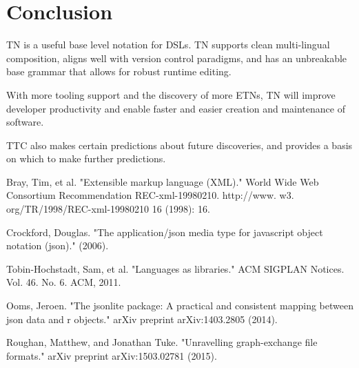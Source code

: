 \documentclass[journal]{IEEEtran}
\begin{document}
\section{Conclusion}

TN is a useful base level notation for DSLs. TN supports clean multi-lingual composition, aligns well with version control paradigms, and has an unbreakable base grammar that allows for robust runtime editing.

With more tooling support and the discovery of more ETNs, TN will improve developer productivity and enable faster and easier creation and maintenance of software.

TTC also makes certain predictions about future discoveries, and provides a basis on which to make further predictions.

\begin{thebibliography}{4}

Bray, Tim, et al. "Extensible markup language (XML)." World Wide Web Consortium Recommendation REC-xml-19980210. http://www. w3. org/TR/1998/REC-xml-19980210 16 (1998): 16.

Crockford, Douglas. "The application/json media type for javascript object notation (json)." (2006).

Tobin-Hochstadt, Sam, et al. "Languages as libraries." ACM SIGPLAN Notices. Vol. 46. No. 6. ACM, 2011.

Ooms, Jeroen. "The jsonlite package: A practical and consistent mapping between json data and r objects." arXiv preprint arXiv:1403.2805 (2014).

Roughan, Matthew, and Jonathan Tuke. "Unravelling graph-exchange file formats." arXiv preprint arXiv:1503.02781 (2015).

\end{thebibliography}

\ifCLASSOPTIONcaptionsoff
  \newpage
\fi
\end{document}
